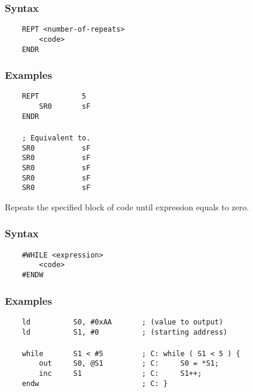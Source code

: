     \subsubsection{Syntax}
        \verb'    REPT <number-of-repeats>'\\
        \verb'        <code>'\\
        \verb'    ENDR'

    \subsubsection{Examples}
        \verb'    REPT          5'\\
        \verb'        SR0       sF'\\
        \verb'    ENDR'\\
        \verb''\\
        \verb'    ; Equivalent to.'\\
        \verb'    SR0           sF'\\
        \verb'    SR0           sF'\\
        \verb'    SR0           sF'\\
        \verb'    SR0           sF'\\
        \verb'    SR0           sF'

    Repeats the specified block of code until expression equals to zero.

    \subsubsection{Syntax}
        \verb'    #WHILE <expression>'\\
        \verb'        <code>'\\
        \verb'    #ENDW'

    \subsubsection{Examples}
        \verb'    ld          S0, #0xAA       ; (value to output)'\\
        \verb'    ld          S1, #0          ; (starting address)'\\
        \verb''\\
        \verb'    while       S1 < #5         ; C: while ( S1 < 5 ) {'\\
        \verb'        out     S0, @S1         ; C:     S0 = *S1;'\\
        \verb'        inc     S1              ; C:     S1++;'\\
        \verb'    endw                        ; C: }'

